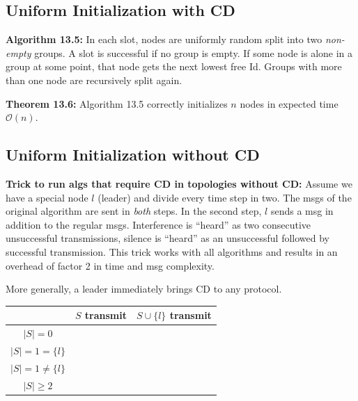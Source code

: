 \documentclass[a4paper, 8pt, landscape]{scrartcl}
\newcommand{\cmark}{\ding{51}}%
\newcommand{\xmark}{\ding{55}}%
\begin{document}
\begin{multicols*}{3}
\subsection{Uniform Initialization with CD}

\textbf{Algorithm 13.5:} In each slot, nodes are uniformly random split into two \textit{non-empty} groups. A slot is successful if no group is empty. If some node is alone in a group at some point, that node gets the next lowest free Id. Groups with more than one node are recursively split again.

\textbf{Theorem 13.6:} Algorithm 13.5 correctly initializes $n$ nodes in expected time $\mathcal{O}(n)$.


\subsection{Uniform Initialization without CD}

\textbf{Trick to run algs that require CD in topologies without CD:} 
Assume we have a special node $l$ (leader) and divide every time step in two. The msgs of the original algorithm are sent in \textit{both} steps. In the second step, $l$ sends a msg in addition to the regular msgs. Interference is “heard” as two consecutive unsuccessful transmissions, silence is “heard” as an unsuccessful followed by successful transmission. This trick works with all algorithms and results in an overhead of factor 2 in time and msg complexity.

More generally, a leader immediately brings CD to any protocol.

\vspace*{-2mm}
\begin{center}
\begin{tabular}{ccc}
	\toprule
	& $S$ transmit & $S \cup \{l\}$ transmit \\ 
	\toprule
	$|S| = 0$ & \xmark & \cellcolor{yellow}\cmark \\ 
	
	$|S| = 1 = \{l\}$ & \cellcolor{yellow}\cmark & \cellcolor{yellow}\cmark \\ 
	
	$|S| = 1 \neq \{l\}$ & \cellcolor{yellow}\cmark & \xmark \\ 
	
	$|S| \geq 2$ & \xmark & \xmark \\ 
	\bottomrule
\end{tabular} 
\end{center}



\end{multicols*}
\end{document}
